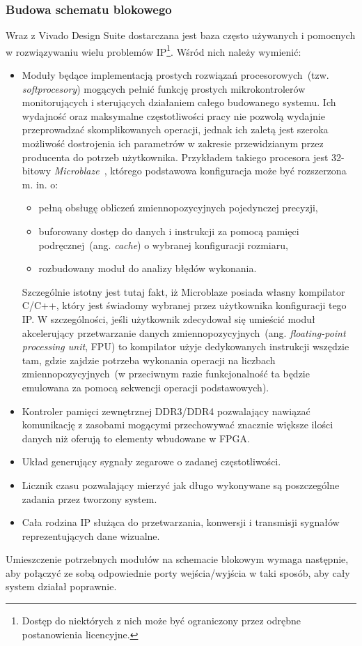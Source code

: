 \subsubsection{Budowa schematu blokowego}
Wraz z Vivado Design Suite dostarczana jest baza często używanych i pomocnych w rozwiązywaniu wielu problemów IP\footnote{Dostęp do niektórych z nich może być ograniczony przez odrębne postanowienia licencyjne.}. Wśród nich należy wymienić:
\begin{itemize}
\item Moduły będące implementacją prostych rozwiązań procesorowych~(tzw. \textit{softprocesory}) mogących pełnić funkcję prostych mikrokontrolerów monitorujących i sterujących działaniem całego budowanego systemu. Ich wydajność oraz maksymalne częstotliwości pracy nie pozwolą wydajnie przeprowadzać skomplikowanych operacji, jednak ich zaletą jest szeroka możliwość dostrojenia ich parametrów w zakresie przewidzianym przez producenta do potrzeb użytkownika. Przykładem takiego procesora jest 32-bitowy  \textit{Microblaze}~\cite{MB_QUICK}\cite{MB_UG984}, którego podstawowa konfiguracja może być rozszerzona m. in. o:
\begin{itemize}
\item pełną obsługę obliczeń zmiennopozycyjnych pojedynczej precyzji,
\item buforowany dostęp do danych i instrukcji za pomocą pamięci podręcznej~(ang. \textit{cache}) o wybranej konfiguracji rozmiaru,
\item rozbudowany moduł do analizy błędów wykonania.
\end{itemize}
Szczególnie istotny jest tutaj fakt, iż Microblaze posiada własny kompilator C/C++, który jest świadomy wybranej przez użytkownika konfiguracji tego IP. W szczególności, jeśli użytkownik zdecydował się umieścić moduł akcelerujący przetwarzanie danych zmiennopozycyjnych~(ang. \textit{floating-point processing unit}, FPU) to kompilator użyje dedykowanych instrukcji wszędzie tam, gdzie zajdzie potrzeba wykonania operacji na liczbach zmiennopozycyjnych~(w przeciwnym razie funkcjonalność ta będzie emulowana za pomocą sekwencji operacji podstawowych).
\item Kontroler pamięci zewnętrznej DDR3/DDR4 pozwalający nawiązać komunikację z zasobami mogącymi przechowywać znacznie większe ilości danych niż oferują to elementy wbudowane w FPGA.
\item Układ generujący sygnały zegarowe o zadanej częstotliwości.
\item Licznik czasu pozwalający mierzyć jak długo wykonywane są poszczególne zadania przez tworzony system.
\item Cała rodzina IP służąca do przetwarzania, konwersji i transmisji sygnałów reprezentujących dane wizualne.
\end{itemize}
Umieszczenie potrzebnych modułów na schemacie blokowym wymaga następnie, aby połączyć ze sobą odpowiednie porty wejścia/wyjścia w taki sposób, aby cały system działał poprawnie.

